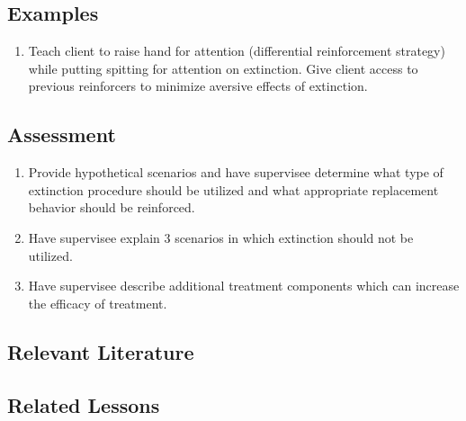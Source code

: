\subsection{Examples}
\begin{enumerate}
\item Teach client to raise hand for attention (differential reinforcement strategy) while putting spitting for attention on extinction. Give client access to previous reinforcers to minimize aversive effects of extinction.
\end{enumerate}
%
\subsection{Assessment}
\begin{enumerate}
\item Provide hypothetical scenarios and have supervisee determine what type of extinction procedure should be utilized and what appropriate replacement behavior should be reinforced. 
\item Have supervisee explain 3 scenarios in which extinction should not be utilized. 
\item Have supervisee describe additional treatment components which can increase the efficacy of treatment.
\end{enumerate}
%
\subsection{Relevant Literature}
\begin{refsection}
\nocite{lerman1995prevalence,
    athens2010investigation}
\printbibliography[heading=none]
\end{refsection}
%
\subsection{Related Lessons} 
\fourcThree{}\\
\fourdEighteen{}\\
\fourdNineteen{}\\
\fourjSix{}\\
\fourjSeven{}\\
\fourjNine{}\\
\fourjTen{}\\
